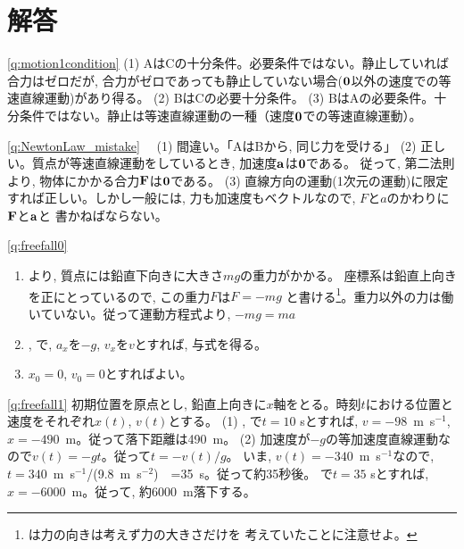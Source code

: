 \section{解答}

\ref{q:motion1condition}
(1) AはCの十分条件。必要条件ではない。静止していれば合力はゼロだが, 
合力がゼロであっても静止していない場合(${\bf 0}$以外の速度での等速直線運動)があり得る。
(2) BはCの必要十分条件。
(3) BはAの必要条件。十分条件ではない。静止は等速直線運動の一種（速度${\bf 0}$での等速直線運動）。
\mv



\ref{q:NewtonLaw_mistake}　
(1) 間違い。「AはBから, 同じ力を受ける」
(2) 正しい。質点が等速直線運動をしているとき, 加速度${\bf a}$は${\bf 0}$である。
従って, 第二法則より, 物体にかかる合力${\bf F}$は${\bf 0}$である。
(3) 直線方向の運動(1次元の運動)に限定すれば正しい。しかし一般には, 
力も加速度もベクトルなので, $F$と$a$のかわりに${\bf F}$と${\bf a}$と
書かねばならない。
\mv


\ref{q:freefall0}
\begin{enumerate}
\item {}より, 質点には鉛直下向きに大きさ$mg$の重力がかかる。
座標系は鉛直上向きを正にとっているので, この重力$F$は$F=-mg$
と書ける\footnote{は力の向きは考えず力の大きさだけを
考えていたことに注意せよ。}。重力以外の力は働いていない。従って運動方程式より, 
$-mg=ma$
\item {}, で, $a_x$を$-g$, $v_x$を$v$とすれば, 与式を得る。
\item $x_0=0$, $v_0=0$とすればよい。
\end{enumerate}
\mv


\ref{q:freefall1} 初期位置を原点とし, 鉛直上向きに$x$軸をとる。時刻$t$における位置と速度をそれぞれ$x(t)$, $v(t)$とする。
(1) , で$t=10$ sとすれば, $v=-98$~m~s$^{-1}$, $x=-490$~m。従って落下距離は490~m。
(2) 加速度が$-g$の等加速度直線運動なので$v(t)=-gt$。従って$t=-v(t)/g$。
いま, $v(t)=-340$~m~s$^{-1}$なので, $t=340$~m~s$^{-1}$/(9.8~m~s$^{-2}$)　=35~s。従って約35秒後。
で$t=35$ sとすれば, $x=-6000$~m。従って, 約6000~m落下する。
\vspace{0.2cm}

